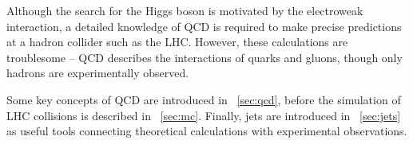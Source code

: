 
Although the search for the Higgs boson is motivated by the electroweak interaction, a
detailed knowledge of \ac{QCD} is required to make precise predictions at a hadron 
collider such as the LHC. However, these calculations are troublesome -- \ac{QCD} 
describes the interactions of quarks and gluons, though only hadrons are experimentally 
observed.

Some key concepts of \ac{QCD} are introduced in \Section~\ref{sec:qcd}, before the 
simulation of LHC collisions is described in \Section~\ref{sec:mc}. Finally, jets are 
introduced in \Section~\ref{sec:jets} as useful tools connecting theoretical calculations 
with experimental observations.
